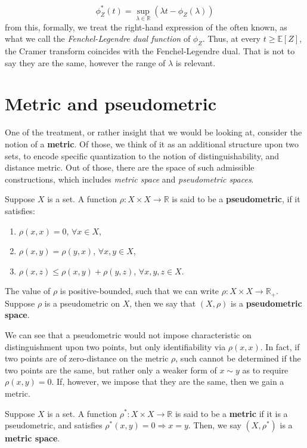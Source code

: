\begin{equation}
    \phi_{Z}^{*}(t) = \sup_{\lambda\in \mathbb{R}}(\lambda t - \phi_{Z}(\lambda))
\end{equation}
from this, formally, we treat the right-hand expression of the often known, as what we call the \textit{Fenchel-Legendre dual function} of $\phi_{Z}$. Thus, at every $t\geq \mathbb{E}[Z]$, the Cramer transform coincides with the Fenchel-Legendre dual. That is not to say they are the same, however the range of $\lambda$ is relevant. 

\section{Metric and pseudometric}

One of the treatment, or rather insight that we would be looking at, consider the notion of a \textbf{metric}. Of those, we think of it as an additional structure upon two sets, to encode specific quantization to the notion of distinguishability, and distance metric. Out of those, there are the space of such admissible constructions, which includes \textit{metric space} and \textit{pseudometric spaces}. 

\begin{definition}
    Suppose $X$ is a set. A function $\rho: X\times X \to \mathbb{R}$ is said to be a \textbf{pseudometric}, if it satisfies:
    \begin{enumerate}[itemsep=1pt,topsep=1pt,label=\roman*]
        \item $\rho(x,x)=0$, $\forall x\in X$, 
        \item $\rho(x,y)=\rho(y,x)$, $\forall x,y\in X$,
        \item $\rho(x,z)\leq \rho(x,y)+\rho(y,z)$, $\forall x,y,z\in X$. 
    \end{enumerate}
    The value of $\rho$ is positive-bounded, such that we can write $\rho:X\times X\to \mathbb{R}_{+}$. Suppose $\rho$ is a pseudometric on $X$, then we say that $(X,\rho)$ is a \textbf{pseudometric space}.
\end{definition}

We can see that a pseudometric would not impose characteristic on distinguishment upon two points, but only identifiability via $\rho(x,x)$. In fact, if two points are of zero-distance on the metric $\rho$, such cannot be determined if the two points are the same, but rather only a weaker form of $x\sim y$ as to require $\rho(x,y)=0$. If, however, we impose that they are the same, then we gain a metric. 
\begin{definition}[Metric]
    Suppose $X$ is a set. A function $\rho^{*}: X\times X \to \mathbb{R}$ is said to be a \textbf{metric} if it is a pseudometric, and satisfies $\rho^{*}(x,y)=0\Rightarrow x=y$. Then, we say $(X,\rho^{*})$ is a \textbf{metric space}.
\end{definition}

